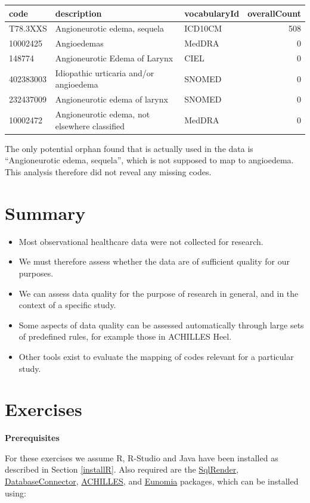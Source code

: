 \documentclass[11pt]{book}
\theoremstyle{definition}
\theoremstyle{definition}
\theoremstyle{definition}
\theoremstyle{remark}
\let\BeginKnitrBlock\begin \let\EndKnitrBlock\end
\begin{document}
\begin{longtable}[]{@{}lllr@{}}
\toprule
code & description & vocabularyId & overallCount\tabularnewline
\midrule
\endhead
T78.3XXS & Angioneurotic edema, sequela & ICD10CM & 508\tabularnewline
10002425 & Angioedemas & MedDRA & 0\tabularnewline
148774 & Angioneurotic Edema of Larynx & CIEL & 0\tabularnewline
402383003 & Idiopathic urticaria and/or angioedema & SNOMED & 0\tabularnewline
232437009 & Angioneurotic edema of larynx & SNOMED & 0\tabularnewline
10002472 & Angioneurotic edema, not elsewhere classified & MedDRA & 0\tabularnewline
\bottomrule
\end{longtable}

The only potential orphan found that is actually used in the data is ``Angioneurotic edema, sequela'', which is not supposed to map to angioedema. This analysis therefore did not reveal any missing codes.

\hypertarget{summary-11}{%
\section{Summary}\label{summary-11}}

\BeginKnitrBlock{rmdsummary}
\begin{itemize}
\item
  Most observational healthcare data were not collected for research.
\item
  We must therefore assess whether the data are of sufficient quality for our purposes.
\item
  We can assess data quality for the purpose of research in general, and in the context of a specific study.
\item
  Some aspects of data quality can be assessed automatically through large sets of predefined rules, for example those in ACHILLES Heel.
\item
  Other tools exist to evaluate the mapping of codes relevant for a particular study.
\end{itemize}
\EndKnitrBlock{rmdsummary}

\hypertarget{exercises-4}{%
\section{Exercises}\label{exercises-4}}

\textbf{Prerequisites}

For these exercises we assume R, R-Studio and Java have been installed as described in Section \ref{installR}. Also required are the \href{https://ohdsi.github.io/SqlRender/}{SqlRender}, \href{https://ohdsi.github.io/DatabaseConnector/}{DatabaseConnector}, \href{https://github.com/OHDSI/Achilles}{ACHILLES}, and \href{https://ohdsi.github.io/Eunomia/}{Eunomia} packages, which can be installed using:
\end{document}
